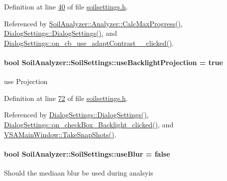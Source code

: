 Definition at line \hyperlink{soilsettings_8h_source_l00040}{40} of file \hyperlink{soilsettings_8h_source}{soilsettings.\+h}.



Referenced by \hyperlink{analyzer_8cpp_source_l00112}{Soil\+Analyzer\+::\+Analyzer\+::\+Calc\+Max\+Progress()}, \hyperlink{dialogsettings_8cpp_source_l00005}{Dialog\+Settings\+::\+Dialog\+Settings()}, and \hyperlink{dialogsettings_8cpp_source_l00370}{Dialog\+Settings\+::on\+\_\+cb\+\_\+use\+\_\+adapt\+Contrast\+\_\+\_\+clicked()}.

\hypertarget{class_soil_analyzer_1_1_soil_settings_a4945fc8b592a2585d3719175e3b80c88}{}
\paragraph[{use\+Backlight\+Projection}]{\setlength{\rightskip}{0pt plus 5cm}bool Soil\+Analyzer\+::\+Soil\+Settings\+::use\+Backlight\+Projection = true}\label{class_soil_analyzer_1_1_soil_settings_a4945fc8b592a2585d3719175e3b80c88}
use Projection 

Definition at line \hyperlink{soilsettings_8h_source_l00072}{72} of file \hyperlink{soilsettings_8h_source}{soilsettings.\+h}.



Referenced by \hyperlink{dialogsettings_8cpp_source_l00005}{Dialog\+Settings\+::\+Dialog\+Settings()}, \hyperlink{dialogsettings_8cpp_source_l00222}{Dialog\+Settings\+::on\+\_\+check\+Box\+\_\+\+Backlight\+\_\+clicked()}, and \hyperlink{vsamainwindow_8cpp_source_l00391}{V\+S\+A\+Main\+Window\+::\+Take\+Snap\+Shots()}.

\hypertarget{class_soil_analyzer_1_1_soil_settings_a21bd246a48a712734af86f592030e18b}{}
\paragraph[{use\+Blur}]{\setlength{\rightskip}{0pt plus 5cm}bool Soil\+Analyzer\+::\+Soil\+Settings\+::use\+Blur = false}\label{class_soil_analyzer_1_1_soil_settings_a21bd246a48a712734af86f592030e18b}
Should the mediaan blur be used during analsyis 

